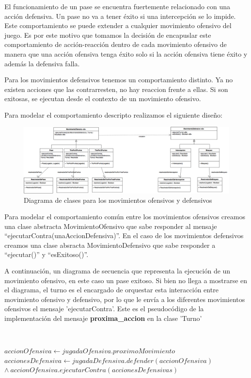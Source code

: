 El funcionamiento de un pase se encuentra fuertemente relacionado con una acción defensiva.
Un pase no va a tener éxito si una intercepción se lo impide. Este comportamiento se puede extender a cualquier movimiento ofensivo del juego.
Es por este motivo que tomamos la decisión de encapuslar este comportamiento de acción-reacción dentro de cada movimiento ofensivo
de manera que una acción ofensiva tenga éxito solo si la acción ofensiva tiene éxito y además la defensiva falla. 

Para los movimientos defensivos tenemos un comportamiento distinto. Ya no existen acciones que las contrarresten, no hay reaccion frente a ellas.
Si son exitosas, se ejecutan desde el contexto de un movimiento ofensivo. 

Para modelar el comportamiento descripto realizamos el siguiente diseño:

\begin{figure}[h!]
  \includegraphics[scale=0.30]{imagenes/diagrama-clases-movimiento.png}
  \caption{Diagrama de clases para los movimientos ofensivos y defensivos}
\end{figure}

Para modelar el comportamiento común entre los movimientos ofensivos creamos una clase abstracta MovimientoOfensivo que sabe responder al mensaje ``ejecutarContra(unaAccionDefensiva)''. En el caso de los movimientos defensivos creamos una clase absracta MovimientoDefensivo que sabe responder a ``ejecutar()'' y ``esExitoso()''. 

A continuación, un diagrama de secuencia que representa la ejecución de un movimiento ofensivo, en este caso un pase exitoso.
Si bien no llega a mostrarse en el diagrama, el turno es el encargado de orquestar esta interacción entre movimiento ofensivo y defensivo, por lo que le envía a los 
diferentes movimientos ofensivos el mensaje 'ejecutarContra'. Este es el pseudocódigo de la implementación del mensaje \textbf{proxima\_accion} en la clase 'Turno'

~

\begin{algorithmic} 
  \State $accionOfensiva\gets jugadaOfensiva.proximoMovimiento$
  \State $accionesDefensiva\gets jugadaDefensiva.defender(accionOfensiva)$
  \State $\wedge \ accionOfensiva.ejecutarContra(accionesDefensivas)$
\end{algorithmic}

